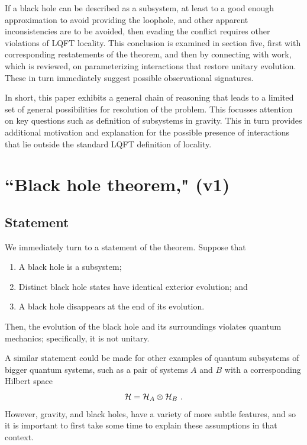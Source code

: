 \documentclass[11pt]{article}
\numberwithin{equation}{section}
\newcommand{\beq}{\begin{equation}}
\newcommand{\eeq}{\end{equation}}
\begin{document}
If a black hole can be described as a subsystem, at least to a good enough approximation to avoid providing the loophole, and other apparent inconsistencies are to be avoided, then evading the conflict requires other violations of LQFT locality.  This conclusion is examined in section five, first with corresponding restatements of the theorem, and then by connecting with work, which is reviewed, on parameterizing interactions that restore  unitary evolution.  These in turn immediately suggest possible observational signatures. 

In short, this paper exhibits a general chain of reasoning that leads to a limited set of general possibilities for resolution of the problem.  This focusses attention on key questions such as definition of subsystems in gravity.  This in turn provides additional motivation and explanation for  
 the possible presence of interactions that lie outside the standard LQFT definition of locality.  





\section{``Black hole theorem," (v1)}




\subsection{Statement}\label{statement}

We immediately turn to a statement of the theorem.  Suppose that 
\begin{enumerate}
\item A black hole is a subsystem;
\item Distinct black hole states have identical exterior evolution; and
\item A black hole disappears at the end of its evolution.
\end{enumerate}

Then, the evolution of the black hole  and its surroundings violates quantum mechanics; specifically, it is not unitary.

A similar statement could be made for other examples of quantum subsystems of bigger quantum systems, such as a pair of systems $A$ and $B$ with a corresponding Hilbert space
\beq\label{Hprod}
{\cal H}={\cal H}_A\otimes{\cal H}_B\ .
\eeq
However, gravity, and black holes, have a variety of more subtle features, and so it is important to first take some time to explain these assumptions in that context.
\end{document}
